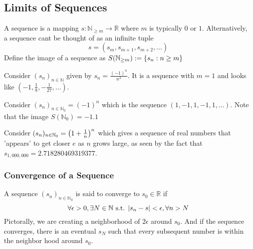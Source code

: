 \documentclass[../notes.tex]{subfiles}
\begin{document}

\subsection{Limits of Sequences}
\begin{definition}[Sequence]
	A sequence is a mapping $s : \mathbb{N}_{\geq m} \to \mathbb{R}$ where $m$ is typically $0$ or $1$. Alternatively, a sequence cant be thought of as an infinite tuple
	\[
		s = (s_m, s_{m+1}, s_{m+2}, \ldots)
	\]
	Define the image of a sequence as $S(\mathbb{N}_{\geq m}) := \qty{s_n : n \geq m}$
\end{definition}

\begin{example}
	Consider $(s_n)_{n \in \mathbb{N}}$ given by $s_n = \frac{(-1)^n}{n^3}$. It is a sequence with $m = 1$ and looks like $(-1, \frac{1}{8}, -\frac{1}{27}, \ldots)$.
\end{example}

\begin{example}
	Consider $(s_n)_{n \in \mathbb{N}_0} = (-1)^n$ which is the sequence $(1, -1, 1, -1, 1, \ldots)$. Note that the image $S(\mathbb{N}_0) = \qty{-1, 1}$
\end{example}

\begin{example}
	Consider $(s_n)_{n \in \mathbb{N}_0} = \qty(1+\frac{1}{n})^n$ which gives a sequence of real numbers that 'appears' to get closer $e$ as $n$ grows large, as seen by the fact that $s_{1,000,000} = 2.718280469319377$.
\end{example}

\subsubsection{Convergence of a Sequence}

\begin{definition}
	A sequence $(s_n)_{n\in \mathbb{N}_0}$ is said to converge to $s_0 \in \mathbb{R}$ if 
	\[
		\forall \epsilon > 0, \exists N \in \mathbb{N} \text{ s.t. } \qty|s_n - s| < \epsilon, \forall n > N
	\]
	Pictorally, we are creating a neighborhood of $2 \epsilon$ around $s_0$. And if the sequence converges, there is an eventual $s_N$ such that every subsequent number is within the neighbor hood around $s_0$.
	\begin{center}
	\end{center}
\end{definition}
\end{document}
